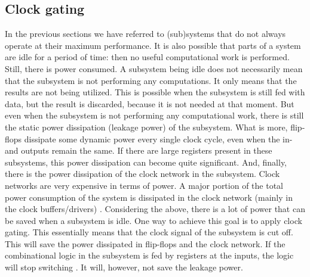  \subsection{Clock gating}
 In the previous sections we have referred to (sub)systems that do not always operate at their maximum performance. It is also possible that parts of a system are idle for a 
 period of time: then no useful computational work is performed. Still, there is power consumed. A subsystem being idle does not necessarily mean that the subsystem is not performing any computations. It only means that the results are not being utilized. This is possible when the subsystem is still fed with data, but the result is discarded, because it is not needed at that moment. But even when the subsystem is not performing any computational work, there is still the static power dissipation (leakage power) of the subsystem. What is more, flip-flops dissipate some dynamic power every single clock cycle, even when the in- and outputs remain the same. If there are large registers present 
 in these subsystems, this power dissipation can become quite significant. And, finally, there is the power dissipation of the clock network in the subsystem. Clock networks are very expensive in terms of power. A major portion of the total power consumption of the system is dissipated in the clock network (mainly in the clock buffers/drivers) \cite{LowPowerMethod}. Considering the above, there is a lot of power that can be saved when a subsystem is idle. One way to achieve this goal is to apply clock gating. This essentially means that the clock signal of the subsystem is cut off. This will save the power dissipated in flip-flops and the clock network. If the combinational logic in the subsystem is fed by 
 registers at the inputs, the logic will stop switching \cite{DesignLowPower}. It will, however, not save the 
 leakage power.
 
